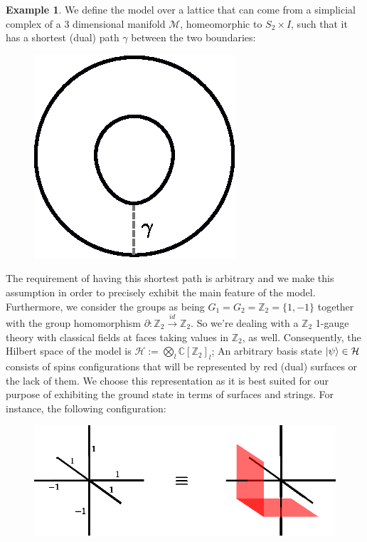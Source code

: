 \documentclass[%
nofootinbib,
 amsmath,amssymb,
aps,
]{revtex4-1}
\theoremstyle{plain}%
\theoremstyle{definition}
\newtheorem{exmp}[thm]{Example}
\theoremstyle{remark}
\begin{document}
\begin{exmp}
We define the model over a lattice that can come from a simplicial complex of a 3 dimensional manifold $\mathcal{M}$, homeomorphic to $S_2 \times I$, such that it has a shortest (dual) path $\gamma$ between the two boundaries:
\begin{figure}[h!]
\centering
    \includegraphics[scale=0.7]{shortest.eps}

\end{figure}

The requirement of having this shortest path is arbitrary and we make this assumption in order to precisely exhibit the main feature of the model. Furthermore, we consider the groups as being $G_1=G_2=\mathbb{Z}_2=\{1,-1\}$ together with the group homomorphism $\partial:\mathbb{Z}_2 \xrightarrow{id} \mathbb{Z}_2$. So we're dealing with a $\mathbb{Z}_2$ 1-gauge theory with classical fields at faces taking values in $\mathbb{Z}_2$, as well. Consequently, the Hilbert space of the model is $\mathcal{H}:=\bigotimes_{l}\mathbb{C}[\mathbb{Z}_2]_l$; An arbitrary basis state $\ket{\psi} \in \mathcal{H}$ consists of spins configurations that will be represented by red (dual) surfaces or the lack of them. We choose this representation as it is best suited for our purpose of exhibiting the ground state in terms of surfaces and strings. For instance, the following configuration:
\begin{figure}[h!]
\centering
\includegraphics[scale=0.8]{graphstate.eps}
\end{figure}


\end{exmp}
\end{document}
